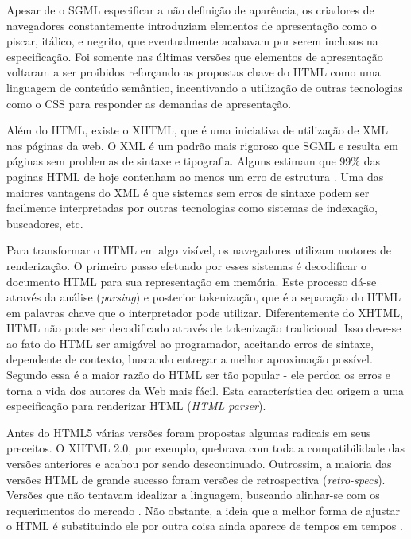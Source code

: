 Apesar de o SGML especificar a não definição de aparência, os criadores de
navegadores constantemente introduziam elementos de apresentação como o
piscar, itálico, e negrito, que eventualmente acabavam por serem inclusos
na especificação. Foi somente nas últimas versões que elementos de
apresentação voltaram a ser proibidos reforçando as propostas chave
do HTML como uma linguagem de conteúdo semântico, incentivando a
utilização de outras tecnologias como o CSS para responder as demandas de
apresentação.

Além do HTML, existe o XHTML, que é uma iniciativa de utilização de
XML nas páginas da web. O XML é um padrão mais rigoroso que SGML e
resulta em páginas sem problemas de sintaxe e tipografia. 
Alguns estimam que 99\% das paginas HTML de hoje
contenham ao menos um erro de estrutura \autocite{diveIntohtml}.
Uma das maiores vantagens do XML é que sistemas sem erros de sintaxe
podem ser facilmente interpretadas por outras tecnologias como
sistemas de indexação, buscadores, etc.

Para transformar o HTML em algo visível, os navegadores utilizam motores
de renderização. O primeiro passo efetuado por esses sistemas é
decodificar o documento HTML para sua representação em memória. Este
processo dá-se através da análise (\textit{parsing}) e posterior
tokenização, que é a separação do HTML em palavras chave que o
interpretador pode utilizar. Diferentemente do XHTML, HTML não pode
ser decodificado através de tokenização tradicional. Isso deve-se ao fato do HTML
ser amigável ao programador, aceitando erros de sintaxe, dependente
de contexto, buscando entregar a melhor aproximação possível. 
Segundo \citet{howBrowsersWork} essa é a maior razão do HTML ser tão popular - 
ele perdoa os erros e torna a vida dos autores da Web mais fácil. Esta
característica deu origem a uma especificação para renderizar HTML
(\textit{HTML parser}).

Antes do HTML5 várias versões foram propostas algumas radicais
em seus preceitos. O XHTML 2.0, por exemplo, quebrava com toda
a compatibilidade das versões anteriores e acabou por sendo descontinuado.
Outrossim, a maioria das versões HTML de grande sucesso foram versões de
retrospectiva (\textit{retro-specs}). Versões que não tentavam
idealizar a linguagem, buscando alinhar-se com os requerimentos do
mercado \autocite{diveIntohtml}. Não obstante, a ideia que a melhor forma
de ajustar o HTML é substituindo ele por outra coisa ainda aparece de tempos
em tempos \autocite{diveIntohtml}.

